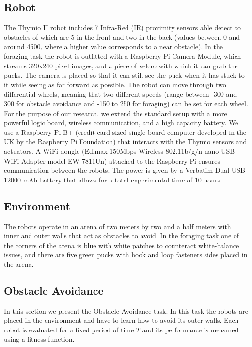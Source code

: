 \documentclass{article}
\begin{document}
	\subsection{Robot} %
	\label{sub:Robot}
	The Thymio II robot includes 7 Infra-Red (IR) proximity sensors able detect
	to obstacles of which are 5 in the front and two in the back (values
	between 0 and around 4500, where a higher value corresponds to a near
	obstacle).
	In the foraging task the robot is outfitted with a Raspberry Pi Camera
	Module, which streams 320x240 pixel images, and a piece of velcro with
	which it can grab the pucks. The camera is placed so that it can still see
	the puck when it has stuck to it while seeing as far forward as possible.
	The robot can move through two differential wheels, meaning that two
	different speeds (range between -300 and 300 for obstacle avoidance and
	-150 to 250 for foraging) can be set for each wheel. For the purpose of our
	research, we extend the standard setup with a more powerful logic board,
	wireless communication, and a high capacity battery. We use a Raspberry Pi
	B+ (credit card-sized single-board computer developed in the UK by the
	Raspberry Pi Foundation) that interacts with the Thymio sensors and
	actuators. A WiFi dongle (Edimax 150Mbps Wireless 802.11b/g/n nano USB WiFi
	Adapter model EW-7811Un) attached to the Raspberry Pi ensures communication
	between the robots. The power is given by a Verbatim Dual USB 12000 mAh
	battery that allows for a total experimental time of 10 hours.

	\subsection{Environment} %
	\label{sub:Environment}
	The robots operate in an arena of two meters by two and a half meters with
	inner and outer walls that act as obstacles to avoid.
	In the foraging task one of the corners of the arena is blue with white
	patches to counteract white-balance issues, and there are five green pucks
	with hook and loop fasteners sides placed in the arena.

	\subsection{Obstacle Avoidance} %
	\label{sub:Obstacle Avoidance}
	In this section we present the Obstacle Avoidance task. In this task the
	robots are placed in the environment and have to learn how to avoid its
	outer walls. Each robot is evaluated for a fixed period of time $T$ and its
	performance is measured using a fitness function.
\end{document}
